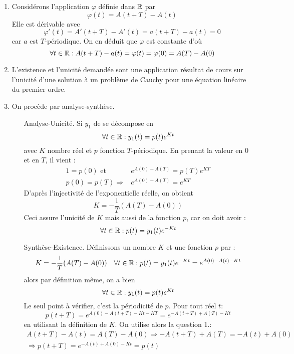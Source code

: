 \begin{enumerate}
 \item Considérons l'application $\varphi$ définie dans $\mathbb{R}$ par
\begin{displaymath}
 \varphi(t) = A(t+T) - A(t)
\end{displaymath}
Elle est  dérivable avec
\begin{displaymath}
 \varphi'(t) = A'(t+T) - A'(t) = a(t+T)-a(t)=0
\end{displaymath}
car $a$ est $T$-périodique. On en déduit que $\varphi$ est constante d'où
\begin{displaymath}
 \forall t\in \mathbb{R} : A(t+T)-a(t)=\varphi(t)=\varphi(0)=A(T)-A(0)
\end{displaymath}

\item L'existence et l'unicité demandée sont une application résultat de cours sur l'unicité d'une solution à un problème de Cauchy pour une équation linéaire du premier ordre. 
\item On procède par analyse-synthèse.
\begin{itemize}
 \item [Analyse-Unicité.] Si $y_1$ de se décompose en
\begin{displaymath}
 \forall t\in \mathbb{R} : y_1(t)=p(t)e^{K t}
\end{displaymath}
avec $K$ nombre réel et $p$ fonction $T$-périodique. En prenant la valeur en $0$ et en $T$, il vient :
\begin{align*}
 1=p(0) \text{ et } & e^{A(0)-A(T)}=p(T)e^{KT}\\
 p(0) =p(T) \Rightarrow & e^{A(0)-A(T)}=e^{KT}
\end{align*}
D'après l'injectivité de l'exponentielle réelle, on obtient
\begin{displaymath}
 K = -\dfrac{1}{T}(A(T)-A(0))
\end{displaymath}
Ceci assure l'unicité de $K$ mais aussi de la fonction $p$, car on doit avoir :
\begin{displaymath}
 \forall t\in \mathbb{R} : p(t)=y_1(t)e^{-K t}
\end{displaymath}
\item[Synthèse-Existence.]
Définissons un nombre $K$ et une fonction $p$ par :
\begin{align*}
 K = -\dfrac{1}{T}(A(T)-A(0)) & & \forall t\in \mathbb{R} : p(t)=y_1(t)e^{-K t}=e^{A(0)-A(t)-Kt}
\end{align*}
alors par définition même, on a bien
\begin{displaymath}
  \forall t\in \mathbb{R} : y_1(t)=p(t)e^{K t}
\end{displaymath}
Le seul point à vérifier, c'est la périodicité de $p$. Pour tout réel $t$:
\begin{displaymath}
 p(t+T) = e^{A(0)-A(t+T)-Kt-KT}=e^{-A(t+T)+A(T)-Kt}
\end{displaymath}
en utilisant la définition de $K$. On utilise alors la question 1.:
\begin{multline*}
 A(t+T)-A(t)=A(T)-A(0)\Rightarrow -A(t+T)+A(T) = -A(t)+A(0)\\
\Rightarrow p(t+T) =e^{-A(t)+A(0)-Kt}=p(t)
\end{multline*}
\end{itemize}


\end{enumerate}
